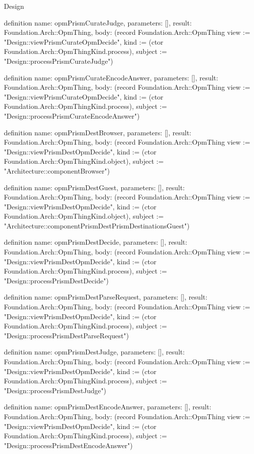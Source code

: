 \begin{lexlean}{Design}
\begin{semanticmodule}
definition{
  name: opmPrismCurateJudge,
  parameters: [],
  result: Foundation.Arch::OpmThing,
  body: (record Foundation.Arch::OpmThing {view := "Design::viewPrismCurateOpmDecide", kind := (ctor Foundation.Arch::OpmThingKind.process), subject := "Design::processPrismCurateJudge"})
}

definition{
  name: opmPrismCurateEncodeAnswer,
  parameters: [],
  result: Foundation.Arch::OpmThing,
  body: (record Foundation.Arch::OpmThing {view := "Design::viewPrismCurateOpmDecide", kind := (ctor Foundation.Arch::OpmThingKind.process), subject := "Design::processPrismCurateEncodeAnswer"})
}

definition{
  name: opmPrismDestBrowser,
  parameters: [],
  result: Foundation.Arch::OpmThing,
  body: (record Foundation.Arch::OpmThing {view := "Design::viewPrismDestOpmDecide", kind := (ctor Foundation.Arch::OpmThingKind.object), subject := "Architecture::componentBrowser"})
}

definition{
  name: opmPrismDestGuest,
  parameters: [],
  result: Foundation.Arch::OpmThing,
  body: (record Foundation.Arch::OpmThing {view := "Design::viewPrismDestOpmDecide", kind := (ctor Foundation.Arch::OpmThingKind.object), subject := "Architecture::componentPrismDestPrismDestinationsGuest"})
}

definition{
  name: opmPrismDestDecide,
  parameters: [],
  result: Foundation.Arch::OpmThing,
  body: (record Foundation.Arch::OpmThing {view := "Design::viewPrismDestOpmDecide", kind := (ctor Foundation.Arch::OpmThingKind.process), subject := "Design::processPrismDestDecide"})
}

definition{
  name: opmPrismDestParseRequest,
  parameters: [],
  result: Foundation.Arch::OpmThing,
  body: (record Foundation.Arch::OpmThing {view := "Design::viewPrismDestOpmDecide", kind := (ctor Foundation.Arch::OpmThingKind.process), subject := "Design::processPrismDestParseRequest"})
}

definition{
  name: opmPrismDestJudge,
  parameters: [],
  result: Foundation.Arch::OpmThing,
  body: (record Foundation.Arch::OpmThing {view := "Design::viewPrismDestOpmDecide", kind := (ctor Foundation.Arch::OpmThingKind.process), subject := "Design::processPrismDestJudge"})
}

definition{
  name: opmPrismDestEncodeAnswer,
  parameters: [],
  result: Foundation.Arch::OpmThing,
  body: (record Foundation.Arch::OpmThing {view := "Design::viewPrismDestOpmDecide", kind := (ctor Foundation.Arch::OpmThingKind.process), subject := "Design::processPrismDestEncodeAnswer"})
}


\end{semanticmodule}
\end{lexlean}
